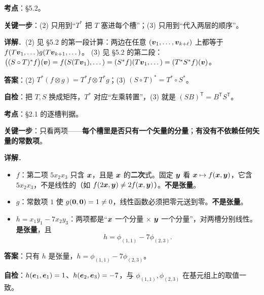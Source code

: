 \documentclass[11pt]{ctexart}
\renewcommand{\qbreak}{\needspace{0.22\textheight}}
\begin{document}
\qbreak
{}\label{ax3}
\qbreak
{}

\textbf{考点}：§5.2。

\textbf{关键一步}：(2) 只用到“$T^*$ 把 $T$ 塞进每个槽”；(3) 只用到“代入两层的顺序”。

\textbf{详解}．(2) 见 §5.2 的第一段计算：两边在任意 $(\boldsymbol{v}_1,\dots,\boldsymbol{v}_{k+\ell})$ 上都等于 $f(T\boldsymbol{v}_1,\dots)g(T\boldsymbol{v}_{k+1},\dots)$。
(3) 见 §5.2 的第二段：$\bigl((S\circ T)^*f\bigr)(\boldsymbol{v})=f(S(T\boldsymbol{v}_1),\dots)=(S^*f)(T\boldsymbol{v}_1,\dots)=(T^*S^*f)(\boldsymbol{v})$。

\textbf{答案}：(2) $T^*(f\otimes g)=T^*f\otimes T^*g$；(3) $(S\circ T)^*=T^*\circ S^*$。

\textbf{自检}：把 $T,S$ 换成矩阵，$T^*$ 对应“左乘转置”，(3) 就是 $(SB)^{\mathsf T}=B^{\mathsf T}S^{\mathsf T}$。

\qbreak
{}\label{ax4}
\qbreak
{}

\textbf{考点}：§2.1 的逐槽判据。

\textbf{关键一步}：只看两项——\textbf{每个槽里是否只有一个矢量的分量}；\textbf{有没有不依赖任何矢量的常数项}。

\textbf{详解}．
\begin{itemize}
  \item $f$：第二项 $5x_2x_3$ 只含 $\boldsymbol{x}$，且是 $\boldsymbol{x}$ 的\textbf{二次}式。固定 $\boldsymbol{y}$ 看 $\boldsymbol{x}\mapsto f(\boldsymbol{x},\boldsymbol{y})$，它含 $5x_2x_3$，不是线性的（如 $f(2\boldsymbol{x},\boldsymbol{y})\ne2f(\boldsymbol{x},\boldsymbol{y})$）。\textbf{不是张量}。
  \item $g$：常数项 $1$ 使 $g(\boldsymbol{0},\boldsymbol{0})=1\ne0$，线性函数必须把零元送到零。\textbf{不是张量}。
  \item $h=x_1y_1-7x_2y_3$：两项都是“$\boldsymbol{x}$ 一个分量 $\times$ $\boldsymbol{y}$ 一个分量”，对两槽分别线性。\textbf{是张量}，且
  \[ h=\phi_{(1,1)}-7\phi_{(2,3)}. \]
\end{itemize}

\textbf{答案}：只有 $h$ 是张量，$h=\phi_{(1,1)}-7\phi_{(2,3)}$。

\textbf{自检}：$h(\boldsymbol{e}_1,\boldsymbol{e}_1)=1$、$h(\boldsymbol{e}_2,\boldsymbol{e}_3)=-7$，与 $\phi_{(1,1)},\phi_{(2,3)}$ 在基元组上的取值一致。
\end{document}
